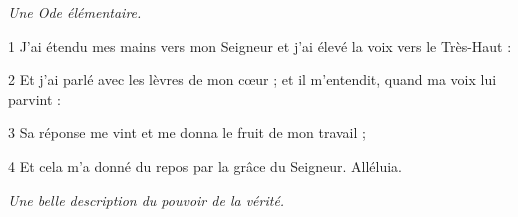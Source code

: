 
\par \textit{Une Ode élémentaire.}

\par 1 J'ai étendu mes mains vers mon Seigneur et j'ai élevé la voix vers le Très-Haut :
\par 2 Et j'ai parlé avec les lèvres de mon cœur ; et il m'entendit, quand ma voix lui parvint :
\par 3 Sa réponse me vint et me donna le fruit de mon travail ;
\par 4 Et cela m'a donné du repos par la grâce du Seigneur. Alléluia.




\par \textit{Une belle description du pouvoir de la vérité.}

